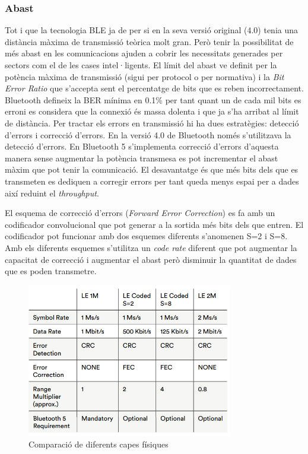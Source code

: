 \subsubsection{Abast}
Tot i que la tecnologia BLE ja de per si en la seva versió original (4.0) tenia una distància màxima de transmissió teòrica molt gran.
Però tenir la possibilitat de més abast en les comunicacions ajuden a cobrir les necessitats generades per sectors com el de les cases intel·ligents.
El límit del abast ve definit per la potència màxima de transmissió (sigui per protocol o per normativa) i la \textit{Bit Error Ratio} que s'accepta sent el percentatge de bits que es reben incorrectament.
Bluetooth defineix la BER mínima en 0.1\% per tant quant un de cada mil bits es erroni es considera que la connexió és massa dolenta i que ja s'ha arribat al límit de distància.
Per tractar els errors en transmissió hi ha dues estratègies: detecció d'errors i correcció d'errors.
En la versió 4.0 de Bluetooth només s'utilitzava la detecció d'errors.
En Bluetooth 5 s'implementa correcció d'errors d'aquesta manera sense augmentar la potència transmesa es pot incrementar el abast màxim que pot tenir la comunicació.
El desavantatge és que més bits dels que es transmeten es dediquen a corregir errors per tant queda menys espai per a dades així reduint el \textit{throughput}.


El esquema de correcció d'errors (\textit{Forward Error Correction}) es fa amb un codificador convolucional que pot generar a la sortida més bits dels que entren. El codificador pot funcionar amb dos esquemes diferents s'anomenen S=2 i S=8.
Amb els diferents esquemes s'utilitza un \textit{code rate} diferent que pot augmentar la capacitat de correcció i augmentar el abast però disminuir la quantitat de dades que es poden transmetre.

\begin{figure}[h!]
	\begin{center}
		\includegraphics[width=0.8\textwidth]{./images/LE_PHY.png}
		\caption{Comparació de diferents capes físiques}
	\end{center}
\end{figure}

